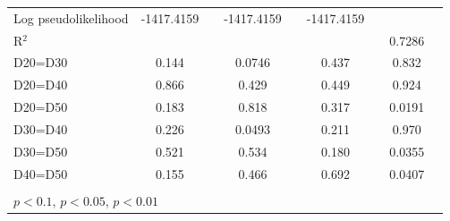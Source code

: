 \begin{tabular}{l|cccccc|cc}
Log pseudolikelihood  & -1417.4159   &         &    -1417.4159              &       &     -1417.4159               &         &           &   \\ 
R$^2$      &                  &         &                  &         &                  &         &      0.7286     &   \\ 
D20=D30         &    0.144         &         &   0.0746         &         &    0.437         &         &    0.832         &         \\
D20=D40         &    0.866         &         &    0.429         &         &    0.449         &         &    0.924         &         \\
D20=D50         &    0.183         &         &    0.818         &         &    0.317         &         &   0.0191         &         \\
D30=D40         &    0.226         &         &   0.0493         &         &    0.211         &         &    0.970         &         \\
D30=D50         &    0.521         &         &    0.534         &         &    0.180         &         &   0.0355         &         \\
D40=D50         &    0.155         &         &    0.466         &         &    0.692         &         &   0.0407         &         \\
\hline\hline
\multicolumn{9}{p{16cm}}{\tiny }\\
\multicolumn{9}{l}{\tiny \sym{*} \(p<0.1\), \sym{**} \(p<0.05\), \sym{***} \(p<0.01\)}\\
\end{tabular}